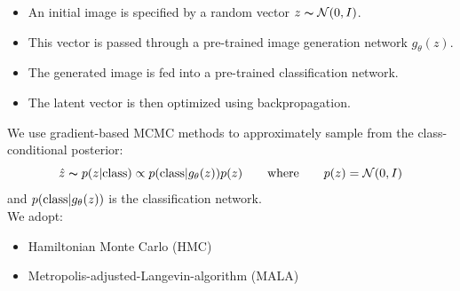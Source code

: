 \documentclass[landscape,a0b,final,a4resizeable]{include/a0poster}
\begin{document}
\begin{poster}
\begin{multicols}{3}
\begin{itemize}
\item An initial image is specified by a random vector $z \thicksim \mathcal{N}(0, I)$.
 \item This vector is passed through a pre-trained image generation network $g_\theta(z)$.
\item The generated image is fed into a pre-trained classification network.
 \item The latent vector is then optimized using backpropagation.
\end{itemize}
\vspace{1cm}
We use gradient-based MCMC methods to approximately sample from the class-conditional posterior:\\
\begin{equation*}
    \hat z \thicksim p(z|\textnormal{class}) \propto p(\textnormal{class} | g_\theta(z)) p(z) \qquad \textnormal{where} \qquad p(z) = \mathcal{N}(0, I)
\end{equation*}
\linebreak
and $p(\textnormal{class} | g_\theta(z))$ is the classification network.\\

We adopt:
\begin{itemize}
\item Hamiltonian Monte Carlo (HMC) 
\item Metropolis-adjusted-Langevin-algorithm (MALA) 
\end{itemize}
 


\end{multicols}
\end{poster}
\end{document}
